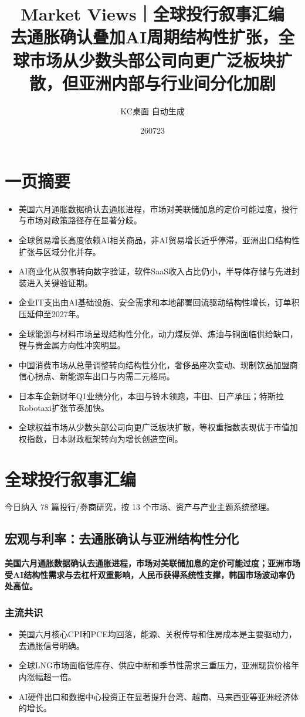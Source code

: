 \documentclass[11pt]{ctexart}
\title{\textbf{Market Views｜全球投行叙事汇编}\\[0.4em]{\large 去通胀确认叠加AI周期结构性扩张，全球市场从少数头部公司向更广泛板块扩散，但亚洲内部与行业间分化加剧}}
\author{KC桌面 自动生成}
\date{260723}
\begin{document}
\maketitle
\tableofcontents
\newpage
\section{一页摘要}
\begin{itemize}
  \item 美国六月通胀数据确认去通胀进程，市场对美联储加息的定价可能过度，投行与市场对政策路径存在显著分歧。
  \item 全球贸易增长高度依赖AI相关商品，非AI贸易增长近乎停滞，亚洲出口结构性扩张与区域分化并存。
  \item AI商业化从叙事转向数字验证，软件SaaS收入占比仍小，半导体存储与先进封装进入关键验证期。
  \item 企业IT支出由AI基础设施、安全需求和本地部署回流驱动结构性增长，订单积压延伸至2027年。
  \item 全球能源与材料市场呈现结构性分化，动力煤反弹、炼油与铜面临供给缺口，锂与贵金属方向性冲突明显。
  \item 中国消费市场从总量调整转向结构性分化，奢侈品座次变动、现制饮品加盟商信心拐点、新能源车出口与内需二元格局。
  \item 日本车企新财年Q1业绩分化，本田与铃木领跑，丰田、日产承压；特斯拉Robotaxi扩张节奏加快。
  \item 全球权益市场从少数头部公司向更广泛板块扩散，等权重指数表现优于市值加权指数，日本财政框架转向为增长创造空间。
\end{itemize}
\section{全球投行叙事汇编}
今日纳入 78 篇投行/券商研究，按 13 个市场、资产与产业主题系统整理。
\newpage
\subsection{宏观与利率：去通胀确认与亚洲结构性分化}
\textbf{美国六月通胀数据确认去通胀进程，市场对美联储加息的定价可能过度；亚洲市场受AI结构性需求与去杠杆双重影响，人民币获得系统性支撑，韩国市场波动率仍处高位。}
\subsubsection*{主流共识}
\begin{itemize}
  \item 美国六月核心CPI和PCE均回落，能源、关税传导和住房成本是主要驱动力，去通胀信号明确。
  \item 全球LNG市场面临低库存、供应中断和季节性需求三重压力，亚洲现货价格年内涨幅超一倍。
  \item AI硬件出口和数据中心投资正在显著提升台湾、越南、马来西亚等亚洲经济体的增长。
\end{itemize}
\end{document}
